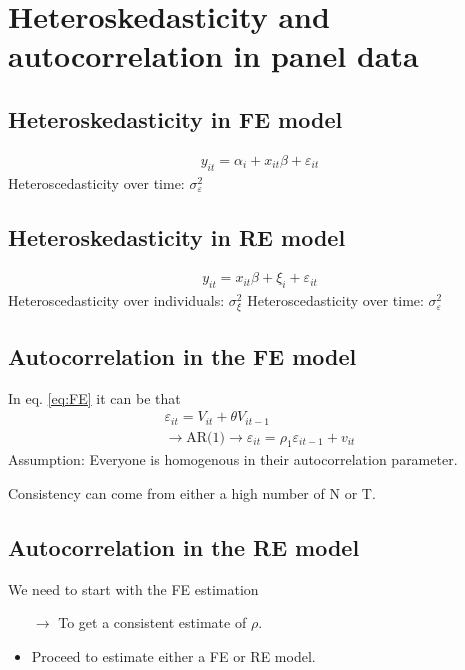 \section{Heteroskedasticity and autocorrelation in panel data} %
\begin{multicols}{2}
\subsection{Heteroskedasticity in FE model}
\begin{align}
  y_{it}= \alpha_i + x_{it}\beta+\varepsilon_{it}
  \label{eq:FE}
\end{align}
Heteroscedasticity over time: $\sigma^2_\varepsilon$\\



\subsection{Heteroskedasticity in RE model}
\begin{align}
  y_{it}=x_{it}\beta+\xi_i+\varepsilon_{it}
  \label{eq:RE}
\end{align}
Heteroscedasticity over individuals: $\sigma^2_\xi$
Heteroscedasticity over time: $\sigma^2_\varepsilon$\\



\subsection{Autocorrelation in the FE model}
In eq. \ref{eq:FE} it can be that
\begin{align*}
  \varepsilon_{it}=V_{it}+\theta V_{it-1}\\
  \rightarrow \textrm{AR(1)} \rightarrow \varepsilon_{it}=\rho_1\varepsilon_{it-1}+v_{it}
\end{align*}
Assumption: Everyone is homogenous in their autocorrelation parameter.\par
Consistency can come from either a high number of N or T.


\subsection{Autocorrelation in the RE model}
We need to start with the FE estimation
\begin{itemize}
  \item[$\rightarrow$] To get a consistent estimate of $\rho$.
  \item Proceed to estimate either a FE or RE model.
\end{itemize}


\end{multicols}



